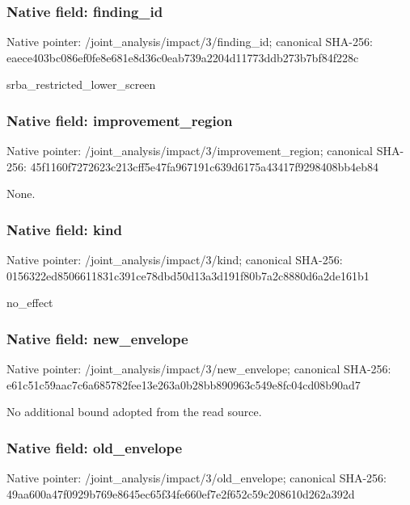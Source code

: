 \documentclass[10pt,a4paper]{article}
\begin{document}
\subsubsection{Native field: finding\_\allowbreak{}id}
Native pointer: /joint\_\allowbreak{}analysis/impact/3/finding\_\allowbreak{}id; canonical SHA-256: eaece403bc086ef0fe8e681e8d36c0eab739a2204d11773ddb273b7bf84f228c

\begingroup\raggedright\sloppy srba\_\allowbreak{}restricted\_\allowbreak{}lower\_\allowbreak{}screen\par\endgroup

\subsubsection{Native field: improvement\_\allowbreak{}region}
Native pointer: /joint\_\allowbreak{}analysis/impact/3/improvement\_\allowbreak{}region; canonical SHA-256: 45f1160f7272623c213cff5e47fa967191c639d6175a43417f9298408bb4eb84

\begingroup\raggedright\sloppy None.\par\endgroup

\subsubsection{Native field: kind}
Native pointer: /joint\_\allowbreak{}analysis/impact/3/kind; canonical SHA-256: 0156322ed8506611831c391ce78dbd50d13a3d191f80b7a2c8880d6a2de161b1

\begingroup\raggedright\sloppy no\_\allowbreak{}effect\par\endgroup

\subsubsection{Native field: new\_\allowbreak{}envelope}
Native pointer: /joint\_\allowbreak{}analysis/impact/3/new\_\allowbreak{}envelope; canonical SHA-256: e61c51c59aac7c6a685782fee13e263a0b28bb890963c549e8fc04cd08b90ad7

\begingroup\raggedright\sloppy No additional bound adopted from the read source.\par\endgroup

\subsubsection{Native field: old\_\allowbreak{}envelope}
Native pointer: /joint\_\allowbreak{}analysis/impact/3/old\_\allowbreak{}envelope; canonical SHA-256: 49aa600a47f0929b769e8645ec65f34fe660ef7e2f652c59c208610d262a392d
\end{document}
